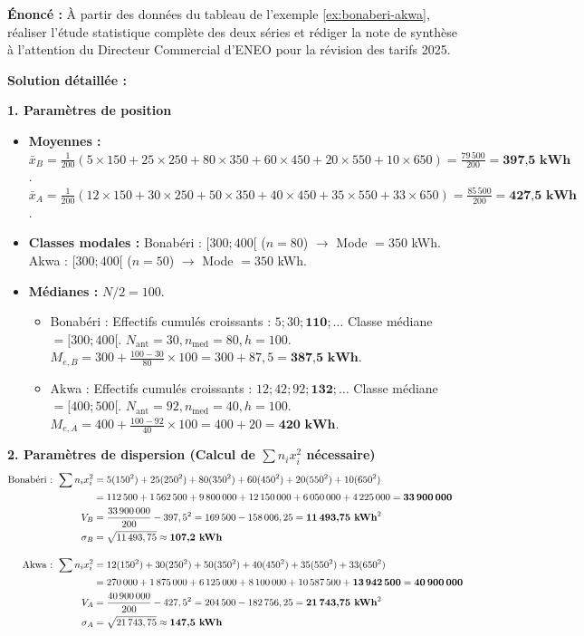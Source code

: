 \documentclass[11pt]{article}
\begin{document}
\begin{exoresolu}\label{exo:complete-bonaberi-akwa}
\textbf{Énoncé :} À partir des données du tableau de l'exemple \ref{ex:bonaberi-akwa}, réaliser l'étude statistique complète des deux séries et rédiger la note de synthèse à l'attention du Directeur Commercial d'ENEO pour la révision des tarifs 2025.

\textbf{Solution détaillée :}

\noindent \textbf{1. Paramètres de position}
\begin{itemize}
    \item \textbf{Moyennes :} 
    $\bar{x}_B = \frac{1}{200}(5\times150 + 25\times250 + 80\times350 + 60\times450 + 20\times550 + 10\times650) = \frac{79\,500}{200} = \textbf{397,5 kWh}$.
    $\bar{x}_A = \frac{1}{200}(12\times150 + 30\times250 + 50\times350 + 40\times450 + 35\times550 + 33\times650) = \frac{85\,500}{200} = \textbf{427,5 kWh}$.
    \item \textbf{Classes modales :} 
    Bonabéri : $[300;400[$ ($n=80$) $\to$ Mode $= 350$ kWh. 
    Akwa : $[300;400[$ ($n=50$) $\to$ Mode $= 350$ kWh.
    \item \textbf{Médianes :} $N/2 = 100$.
    \begin{itemize}
        \item Bonabéri : Effectifs cumulés croissants : $5 ; 30 ; \mathbf{110} ; \dots$ Classe médiane $=[300;400[$. $N_{\text{ant}}=30, n_{\text{med}}=80, h=100$.
        $M_{e,B} = 300 + \frac{100-30}{80}\times 100 = 300 + 87,5 = \textbf{387,5 kWh}$.
        \item Akwa : Effectifs cumulés croissants : $12 ; 42 ; 92 ; \mathbf{132} ; \dots$ Classe médiane $=[400;500[$. $N_{\text{ant}}=92, n_{\text{med}}=40, h=100$.
        $M_{e,A} = 400 + \frac{100-92}{40}\times 100 = 400 + 20 = \textbf{420 kWh}$.
    \end{itemize}
\end{itemize}

\noindent \textbf{2. Paramètres de dispersion (Calcul de $\sum n_i x_i^2$ nécessaire)}
\begin{align*}
\text{Bonabéri : } \sum n_i x_i^2 &= 5(150^2) + 25(250^2) + 80(350^2) + 60(450^2) + 20(550^2) + 10(650^2) \\
&= 112\,500 + 1\,562\,500 + 9\,800\,000 + 12\,150\,000 + 6\,050\,000 + 4\,225\,000 = \textbf{33\,900\,000} \\
V_B &= \frac{33\,900\,000}{200} - 397,5^2 = 169\,500 - 158\,006,25 = \textbf{11\,493,75 kWh}^2 \\
\sigma_B &= \sqrt{11\,493,75} \approx \textbf{107,2 kWh} \\[1em]
\text{Akwa : } \sum n_i x_i^2 &= 12(150^2) + 30(250^2) + 50(350^2) + 40(450^2) + 35(550^2) + 33(650^2) \\
&= 270\,000 + 1\,875\,000 + 6\,125\,000 + 8\,100\,000 + 10\,587\,500 + \mathbf{13\,942\,500} = \textbf{40\,900\,000} \\
V_A &= \frac{40\,900\,000}{200} - 427,5^2 = 204\,500 - 182\,756,25 = \textbf{21\,743,75 kWh}^2 \\
\sigma_A &= \sqrt{21\,743,75} \approx \textbf{147,5 kWh}
\end{align*}


\end{exoresolu}
\end{document}
